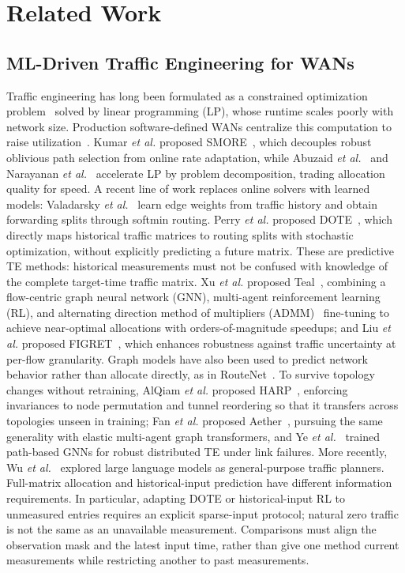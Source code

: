 \section{Related Work}
\label{sec:related}


\subsection{ML-Driven Traffic Engineering for WANs}

Traffic engineering has long been formulated as a constrained optimization
problem~\cite{fortz2000,wang2006} solved by linear programming (LP), whose
runtime scales poorly with network size. Production software-defined WANs
centralize this computation to raise utilization~\cite{jain2013,hong2013,hong2018}.
Kumar \emph{et al.} proposed
SMORE~\cite{smore}, which decouples robust oblivious path selection
from online rate adaptation, while Abuzaid \emph{et al.}~\cite{ncflow} and
Narayanan \emph{et al.}~\cite{pop} accelerate LP by problem decomposition,
trading allocation quality for speed. A recent line of work replaces online
solvers with learned models: Valadarsky \emph{et al.}~\cite{valadarsky2017}
learn edge weights from traffic history and obtain forwarding splits through
softmin routing. Perry \emph{et al.} proposed DOTE~\cite{dote}, which directly
maps historical traffic matrices to routing splits with stochastic
optimization, without explicitly predicting a future matrix. These are
predictive TE methods: historical measurements must not be confused with
knowledge of the complete target-time traffic matrix. Xu \emph{et al.} proposed
Teal~\cite{teal}, combining a flow-centric graph neural network (GNN),
multi-agent reinforcement learning (RL), and alternating direction method of
multipliers (ADMM)~\cite{boyd2011} fine-tuning to achieve near-optimal
allocations with
orders-of-magnitude speedups; and Liu \emph{et al.} proposed
FIGRET~\cite{figret}, which enhances robustness against traffic uncertainty at
per-flow granularity. Graph models have also been used to predict network
behavior rather than allocate directly, as in RouteNet~\cite{rusek2019}.
To survive topology changes without retraining, AlQiam
\emph{et al.} proposed HARP~\cite{harp}, enforcing invariances to node
permutation and tunnel reordering so that it transfers across topologies unseen
in training; Fan \emph{et al.} proposed Aether~\cite{aether2025}, pursuing the
same generality with elastic multi-agent graph transformers, and Ye
\emph{et al.}~\cite{ye2025} trained path-based GNNs for robust distributed TE
under link failures. More recently, Wu \emph{et al.}~\cite{netllm} explored
large language models as general-purpose traffic planners. Full-matrix
allocation and historical-input prediction have different information
requirements. In particular, adapting DOTE or historical-input RL to
unmeasured entries requires an explicit sparse-input protocol; natural zero
traffic is not the same as an unavailable measurement. Comparisons must align
the observation mask and the latest input time, rather than give one method
current measurements while restricting another to past measurements.

